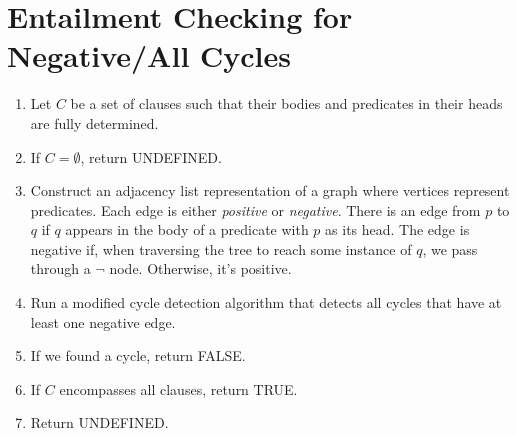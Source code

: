 \documentclass[runningheads]{llncs}
\begin{document}
\section{Entailment Checking for Negative/All Cycles}

\begin{enumerate}
\item Let $C$ be a set of clauses such that their bodies and predicates in their
  heads are fully determined.
\item If $C = \emptyset$, return UNDEFINED.
\item Construct an adjacency list representation of a graph where vertices
  represent predicates. Each edge is either \emph{positive} or \emph{negative}.
  There is an edge from $p$ to $q$ if $q$ appears in the body of a predicate
  with $p$ as its head. The edge is negative if, when traversing the tree to
  reach some instance of $q$, we pass through a $\neg$ node. Otherwise, it's
  positive.
\item Run a modified cycle detection algorithm that detects all cycles that have
  at least one negative edge.
\item If we found a cycle, return FALSE.
\item If $C$ encompasses all clauses, return TRUE.
\item Return UNDEFINED.
\end{enumerate}




\end{document}
